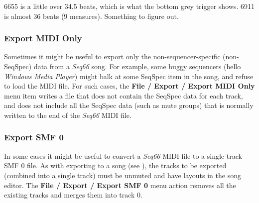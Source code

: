    6655 is a little over 34.5 beats, which is what the bottom grey trigger
   shows.
   6911 is almost 36 beats (9 measures).  Something to figure out.

\subsubsection{Export MIDI Only}
\label{subsubsec:midi_export_file_export_midi_only}

   Sometimes it might be useful to export only the non-sequencer-specific
   (non-SeqSpec) data from a \textsl{Seq66} song.
   For example, some buggy sequencers
   (hello \textsl{Windows Media Player})
   might balk at some SeqSpec item in the song, and refuse to load the MIDI
   file.
   For such cases,
   the \textbf{File / Export / Export MIDI Only} menu
   item writes a file that does not contain
   the SeqSpec data for each track, and does not include all the SeqSpec data
   (such as mute groups) that is normally written to the end of the
   \textsl{Seq66} MIDI file.

\subsubsection{Export SMF 0}
\label{subsubsec:midi_export_file_export_smf_0}

   In some cases it might be useful to convert a \textsl{Seq66} MIDI file to a
   single-track SMF 0 file.
   As with exporting to a song
   (see ),
   the tracks to be exported (combined into a single track) must be unmuted
   and have layouts in the song editor.
   The \textbf{File / Export / Export SMF 0 } menu
   action removes all the existing tracks and merges them into track 0.

